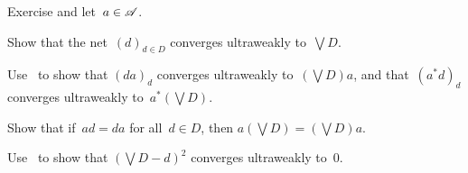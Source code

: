 \documentclass[a]{subfiles}
\begin{document}
\begin{parsec}
\begin{point}{Exercise}
and let~$a\in \mathscr{A}$.
\begin{point}%
Show that the net~$(d)_{d\in D}$ converges ultraweakly to~$\bigvee D$.
\end{point}
\begin{point}%
Use~
to show that $(da)_d$ converges ultraweakly to~$(\bigvee D)a$,
and that~$(a^*d)_d$ converges ultraweakly to~$a^* (\bigvee D)$.
\end{point}
\begin{point}%
Show that if~$ad=da$ for all~$d\in D$,
then $a(\bigvee D) = (\bigvee D)a $.
\end{point}
\begin{point}%
Use~
to show that $(\bigvee D-d)^2$ converges ultraweakly to~$0$.


\end{point}
\end{point}
\end{parsec}
\end{document}
